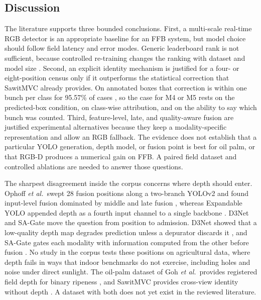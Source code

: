 \subsection{Discussion}

The literature supports three bounded conclusions. First, a multi-scale real-time RGB detector is an appropriate baseline for an FFB system, but model choice should follow field latency and error modes. Generic leaderboard rank is not sufficient, because controlled re-training changes the ranking with dataset and model size \cite{alif2024yoloevolution}. Second, an explicit identity mechanism is justified for a four- or eight-position census only if it outperforms the statistical correction that SawitMVC already provides. On annotated boxes that correction is within one bunch per class for 95.57\% of cases \cite{indriani2026sawitmvc}, so the case for M4 or M5 rests on the predicted-box condition, on class-wise attribution, and on the ability to say which bunch was counted. Third, feature-level, late, and quality-aware fusion are justified experimental alternatives because they keep a modality-specific representation and allow an RGB fallback. The evidence does not establish that a particular YOLO generation, depth model, or fusion point is best for oil palm, or that RGB-D produces a numerical gain on FFB. A paired field dataset and controlled ablations are needed to answer those questions.

The sharpest disagreement inside the corpus concerns where depth should enter. Ophoff \textit{et al.}\ swept 28 fusion positions along a two-branch YOLOv2 and found input-level fusion dominated by middle and late fusion \cite{ophoff2019multimodal}, whereas Expandable YOLO appended depth as a fourth input channel to a single backbone \cite{takahashi2020expandableyolo}. D3Net and SA-Gate move the question from position to admission. D3Net showed that a low-quality depth map degrades prediction unless a depurator discards it \cite{fan2020d3net}, and SA-Gate gates each modality with information computed from the other before fusion \cite{chen2020sagate}. No study in the corpus tests these positions on agricultural data, where depth fails in ways that indoor benchmarks do not exercise, including holes and noise under direct sunlight. The oil-palm dataset of Goh \textit{et al.}\ provides registered field depth for binary ripeness \cite{goh2025palmdataset}, and SawitMVC provides cross-view identity without depth \cite{indriani2026sawitmvc}. A dataset with both does not yet exist in the reviewed literature.

